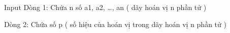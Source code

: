 Input
Dòng 1: Chứa n số a1, a2, …, an ( dãy hoán vị n phần tử )  

   Dòng 2: Chứa số p ( số hiệu của hoán vị trong dãy hoán vị n phần tử )